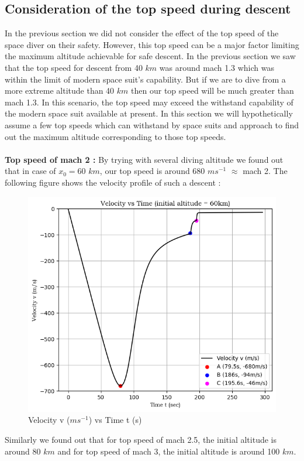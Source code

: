 \documentclass[a4paper, 14pt]{extarticle}
\begin{document}
\subsection{Consideration of the top speed during descent}
In the previous section we did not consider the effect of the top speed of the space diver on their safety. However, this top speed can be a major factor limiting the maximum altitude achievable for safe descent. In the previous section we saw that the top speed for descent from 40 $km$ was around mach 1.3 which was within the limit of modern space suit’s capability. But if we are to dive from a more extreme altitude than 40 $km$ then our top speed will be much greater than mach 1.3. In this scenario, the top speed may exceed the withstand capability of the modern space suit available at present. In this section we will hypothetically assume a few top speeds which can withstand by space suits and approach to find out the maximum altitude corresponding to those top speeds.\\ \\
\textbf{Top speed of mach 2 :} By trying with several diving altitude we found out that in case of $x_0=\text{60 }km$, our top speed is around 680 $ms^{-1}$  $\approx$ mach 2. The following figure shows the velocity profile of such a descent :
\begin{figure}[H]
\centering
\includegraphics[width=0.7\linewidth]{figures/60-2}
\caption{\label{fig:615A/60-2}Velocity v ($ms^{-1}$) vs Time t (s)}
\end{figure}
Similarly we found out that for top speed of mach 2.5, the initial altitude is around 80 $km$ and for top speed of mach 3, the initial altitude is around 100 $km$.
\end{document}
